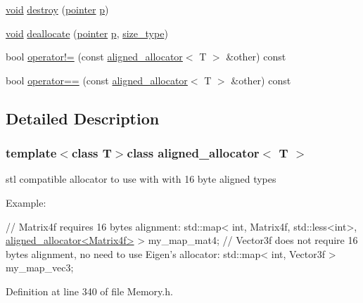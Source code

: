 \begin{DoxyCompactItemize}
\item 
\hyperlink{group___u_a_v_objects_plugin_ga444cf2ff3f0ecbe028adce838d373f5c}{void} \hyperlink{classaligned__allocator_ae48017a15c2c0ef1a2e79aad285f74e3}{destroy} (\hyperlink{classaligned__allocator_a6594075542435bfbdd8e96e197b12ab7}{pointer} \hyperlink{glext_8h_aa5367c14d90f462230c2611b81b41d23}{p})
\item 
\hyperlink{group___u_a_v_objects_plugin_ga444cf2ff3f0ecbe028adce838d373f5c}{void} \hyperlink{classaligned__allocator_ac7eb845917bceaab9680a6b8e6dbde7d}{deallocate} (\hyperlink{classaligned__allocator_a6594075542435bfbdd8e96e197b12ab7}{pointer} \hyperlink{glext_8h_aa5367c14d90f462230c2611b81b41d23}{p}, \hyperlink{classaligned__allocator_a8546aec5c19297c6a68abc86ee5ef728}{size\-\_\-type})
\item 
bool \hyperlink{classaligned__allocator_ac7cdfd86ba1342b51a392db53848199a}{operator!=} (const \hyperlink{classaligned__allocator}{aligned\-\_\-allocator}$<$ T $>$ \&other) const 
\item 
bool \hyperlink{classaligned__allocator_a9112953690fe7d23b6b7a65451f68d98}{operator==} (const \hyperlink{classaligned__allocator}{aligned\-\_\-allocator}$<$ T $>$ \&other) const 
\end{DoxyCompactItemize}


\subsection{Detailed Description}
\subsubsection*{template$<$class T$>$class aligned\-\_\-allocator$<$ T $>$}

stl compatible allocator to use with with 16 byte aligned types 

Example\-: 
\begin{DoxyCode}
\textcolor{comment}{// Matrix4f requires 16 bytes alignment:}
std::map< int, Matrix4f, std::less<int>, \hyperlink{classaligned__allocator}{aligned\_allocator<Matrix4f>} > 
      my\_map\_mat4;
\textcolor{comment}{// Vector3f does not require 16 bytes alignment, no need to use Eigen's allocator:}
std::map< int, Vector3f > my\_map\_vec3;
\end{DoxyCode}
 

Definition at line 340 of file Memory.\-h.



